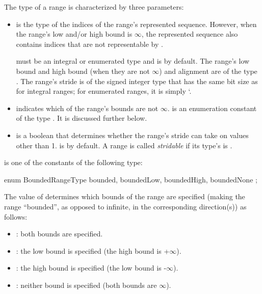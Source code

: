 The type of a range is characterized by three parameters:
\begin{itemize}

\item {} is the type of the indices of the range's
  represented sequence. However, when the range's low and/or high
  bound is $\infty$, the represented sequence also contains indices
  that are not representable by .

   must be an integral or enumerated type and is  by default.
%
  The range's low bound and high bound (when they are not $\infty$)
  and alignment are of the type . The range's stride
  is of the signed integer type that has the same bit size as 
  for integral ranges; for enumerated ranges, it is simply `.

\item {} indicates which of the range's bounds are not $\infty$.
   is an enumeration constant of the type
  . It is discussed further below.

\item {} is a boolean that determines whether the range's stride
  can take on values other than 1.
   is  by default.
  A range is called \emph{stridable}
  if its type's  is .

\end{itemize}

 is one of the constants of the following type:

\begin{chapel}
enum BoundedRangeType { bounded, boundedLow, boundedHigh, boundedNone };
\end{chapel}

The value of  determines which bounds of the range
are specified (making the range ``bounded'', as opposed to infinite,
in the corresponding direction(s))
as follows:

\begin{itemize}

\item {}:
  both bounds are specified.

\item {}:
  the low bound is specified (the high bound is +$\infty$).

\item {}:
  the high bound is specified (the low bound is -$\infty$).

\item {}:
  neither bound is specified (both bounds are $\infty$).

\end{itemize}

